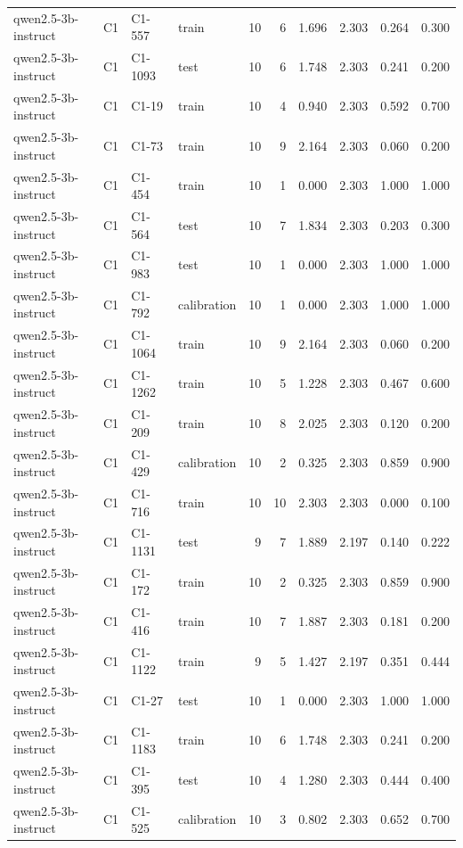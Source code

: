 \begin{table}
\begin{tabular}{llllrrrrrr}
qwen2.5-3b-instruct & C1 & C1-557 & train & 10 & 6 & 1.696 & 2.303 & 0.264 & 0.300 \\
qwen2.5-3b-instruct & C1 & C1-1093 & test & 10 & 6 & 1.748 & 2.303 & 0.241 & 0.200 \\
qwen2.5-3b-instruct & C1 & C1-19 & train & 10 & 4 & 0.940 & 2.303 & 0.592 & 0.700 \\
qwen2.5-3b-instruct & C1 & C1-73 & train & 10 & 9 & 2.164 & 2.303 & 0.060 & 0.200 \\
qwen2.5-3b-instruct & C1 & C1-454 & train & 10 & 1 & 0.000 & 2.303 & 1.000 & 1.000 \\
qwen2.5-3b-instruct & C1 & C1-564 & test & 10 & 7 & 1.834 & 2.303 & 0.203 & 0.300 \\
qwen2.5-3b-instruct & C1 & C1-983 & test & 10 & 1 & 0.000 & 2.303 & 1.000 & 1.000 \\
qwen2.5-3b-instruct & C1 & C1-792 & calibration & 10 & 1 & 0.000 & 2.303 & 1.000 & 1.000 \\
qwen2.5-3b-instruct & C1 & C1-1064 & train & 10 & 9 & 2.164 & 2.303 & 0.060 & 0.200 \\
qwen2.5-3b-instruct & C1 & C1-1262 & train & 10 & 5 & 1.228 & 2.303 & 0.467 & 0.600 \\
qwen2.5-3b-instruct & C1 & C1-209 & train & 10 & 8 & 2.025 & 2.303 & 0.120 & 0.200 \\
qwen2.5-3b-instruct & C1 & C1-429 & calibration & 10 & 2 & 0.325 & 2.303 & 0.859 & 0.900 \\
qwen2.5-3b-instruct & C1 & C1-716 & train & 10 & 10 & 2.303 & 2.303 & 0.000 & 0.100 \\
qwen2.5-3b-instruct & C1 & C1-1131 & test & 9 & 7 & 1.889 & 2.197 & 0.140 & 0.222 \\
qwen2.5-3b-instruct & C1 & C1-172 & train & 10 & 2 & 0.325 & 2.303 & 0.859 & 0.900 \\
qwen2.5-3b-instruct & C1 & C1-416 & train & 10 & 7 & 1.887 & 2.303 & 0.181 & 0.200 \\
qwen2.5-3b-instruct & C1 & C1-1122 & train & 9 & 5 & 1.427 & 2.197 & 0.351 & 0.444 \\
qwen2.5-3b-instruct & C1 & C1-27 & test & 10 & 1 & 0.000 & 2.303 & 1.000 & 1.000 \\
qwen2.5-3b-instruct & C1 & C1-1183 & train & 10 & 6 & 1.748 & 2.303 & 0.241 & 0.200 \\
qwen2.5-3b-instruct & C1 & C1-395 & test & 10 & 4 & 1.280 & 2.303 & 0.444 & 0.400 \\
qwen2.5-3b-instruct & C1 & C1-525 & calibration & 10 & 3 & 0.802 & 2.303 & 0.652 & 0.700 \\

\end{tabular}
\end{table}
